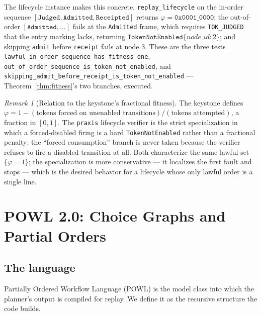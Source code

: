 \documentclass[11pt,oneside]{book}
\theoremstyle{definition}
\theoremstyle{plain}
\theoremstyle{remark}
\newtheorem*{remark}{Remark}
\newcommand{\Fitness}{\varphi}
\newcommand{\code}[1]{\texttt{#1}}
\begin{document}
The lifecycle instance makes this concrete. \code{replay\_lifecycle} on the in-order sequence
$[\code{Judged},\code{Admitted},\code{Receipted}]$ returns $\Fitness=\code{0x0001\_0000}$; the
out-of-order $[\code{Admitted},\dots]$ fails at the \code{Admitted} frame, which requires
\code{TOK\_JUDGED} that the entry marking lacks, returning
$\code{TokenNotEnabled}\{node\_id:2\}$; and skipping \code{admit} before \code{receipt} fails at
node $3$. These are the three tests \code{lawful\_in\_order\_sequence\_has\_fitness\_one},
\code{out\_of\_order\_sequence\_is\_token\_not\_enabled}, and
\code{skipping\_admit\_before\_receipt\_is\_token\_not\_enabled} --- Theorem~\ref{thm:fitness}'s
two branches, executed.

\begin{remark}[Relation to the keystone's fractional fitness]
The keystone defines $\Fitness=1-(\text{tokens forced on unenabled transitions})/(\text{tokens
attempted})$, a fraction in $[0,1]$. The \code{praxis} lifecycle verifier is the strict
specialization in which a forced-disabled firing is a hard \code{TokenNotEnabled} rather than a
fractional penalty: the ``forced consumption'' branch is never taken because the verifier
refuses to fire a disabled transition at all. Both characterize the same lawful set
$\{\Fitness=1\}$; the specialization is more conservative --- it localizes the first fault and
stops --- which is the desired behavior for a lifecycle whose only lawful order is a single
line.
\end{remark}

\chapter{POWL 2.0: Choice Graphs and Partial Orders}
\label{ch:powl}

\section{The language}

Partially Ordered Workflow Language (POWL) \cite{powl2023} is the model class into which the
planner's output is compiled for replay. We define it as the recursive structure the code
builds.
\end{document}
